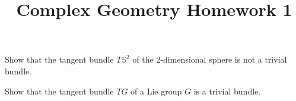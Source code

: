\documentclass[12pt]{article}
\title{Complex Geometry Homework 1}
\author{}
\date{}
\begin{document}
\maketitle
\begin{problem}
Show that the tangent bundle \(T\mathbb{S}^2\) of the 2-dimensional sphere is not
a trivial bundle.
\end{problem}
\begin{problem}
    Show that the tangent bundle \(TG\) of a Lie group \(G\) is a trivial bundle.
\end{problem}
\end{document}
